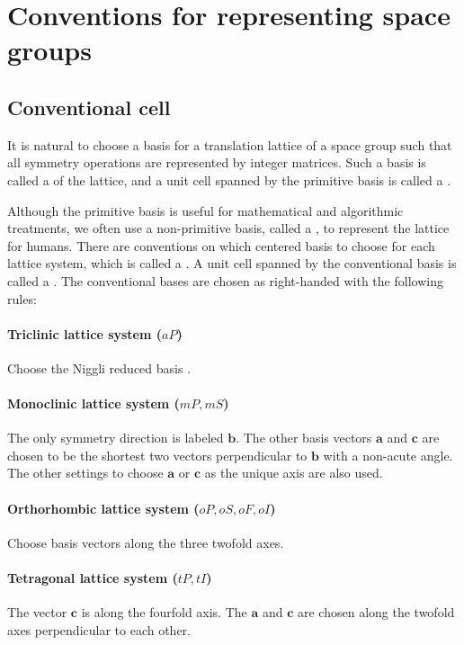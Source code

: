 \section{\label{sec:convention}Conventions for representing space groups}

\subsection{Conventional cell}

It is natural to choose a basis for a translation lattice of a space group such that all symmetry operations are represented by integer matrices.
Such a basis is called a  of the lattice, and a unit cell spanned by the primitive basis is called a .

Although the primitive basis is useful for mathematical and algorithmic treatments, we often use a non-primitive basis, called a , to represent the lattice for humans.
There are conventions on which centered basis to choose for each lattice system, which is called a  \cite{burzlaff2016crystal}.
A unit cell spanned by the conventional basis is called a .
The conventional bases are chosen as right-handed with the following rules:

\paragraph{Triclinic lattice system ($aP$)}
Choose the Niggli reduced basis \cite{Krivy:a12875}.

\paragraph{Monoclinic lattice system ($mP, mS$)}
The only symmetry direction is labeled $\bm{b}$.
The other basis vectors $\bm{a}$ and $\bm{c}$ are chosen to be the shortest two vectors perpendicular to $\bm{b}$ with a non-acute angle.
The other settings to choose $\bm{a}$ or $\bm{c}$ as the unique axis are also used.

\paragraph{Orthorhombic lattice system ($oP, oS, oF, oI$)}
Choose basis vectors along the three twofold axes.

\paragraph{Tetragonal lattice system ($tP, tI$)}
The vector $\bm{c}$ is along the fourfold axis.
The $\bm{a}$ and $\bm{c}$ are chosen along the twofold axes perpendicular to each other.

